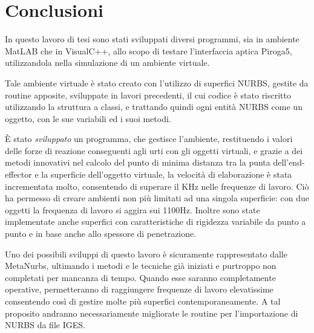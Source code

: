 \chapter*{Conclusioni}
\thispagestyle{empty}


In questo lavoro di tesi sono stati sviluppati diversi programmi,
sia in ambiente MatLAB che in VisualC++, allo scopo di testare
l'interfaccia aptica Piroga5, utilizzandola
nella simulazione di un ambiente virtuale.

Tale ambiente virtuale è stato creato con l'utilizzo di superfici
NURBS, gestite da routine apposite, sviluppate in lavori precedenti, il cui codice è stato riscritto utilizzando la struttura a classi, e trattando quindi
 ogni entità NURBS come un oggetto, con le sue variabili ed i suoi metodi.

\`E stato \textit{sviluppato} un programma, che gestisce
l'ambiente, restituendo i valori delle forze di reazione
conseguenti agli urti con gli oggetti virtuali, e grazie a dei metodi innovativi nel calcolo del punto di minima
distanza tra la punta dell'end-effector e la superficie
dell'oggetto virtuale, la velocità di elaborazione è
stata incrementata molto, consentendo di superare il KHz nelle frequenze di lavoro. 
Ciò ha permesso di
creare ambienti non più limitati ad una singola superficie: con
due oggetti la frequenza di lavoro si aggira sui 1100Hz. Inoltre sono state implementate 
anche superfici con caratteristiche di
rigidezza variabile da punto a punto e in base anche allo spessore di
penetrazione.

Uno dei possibili sviluppi di questo lavoro è sicuramente rappresentato dalle MetaNurbs, ultimando i metodi e le tecniche già iniziati e purtroppo non completati per mancanza di tempo. Quando esse saranno completamente operative, permetteranno di raggiungere frequenze di lavoro elevatissime consentendo così di gestire molte più superfici contemporaneamente. A tal proposito andranno necessariamente migliorate le routine per l'importazione di NURBS da file IGES.


\clearpage
\thispagestyle{empty}
\cleardoublepage
